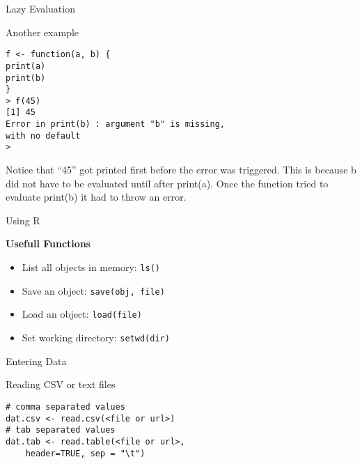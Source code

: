 \begin{frame}[fragile]{Lazy Evaluation}

Another example

\begin{verbatim}
f <- function(a, b) {
print(a)
print(b)
}
> f(45)
[1] 45
Error in print(b) : argument "b" is missing, 
with no default
>
\end{verbatim}

Notice that ``45'' got printed first before the error was triggered.
This is because b did not have to be evaluated until after print(a).
Once the function tried to evaluate print(b) it had to throw an error.

\end{frame}

\begin{frame}[fragile]{Using R}

\begin{block}{\textbf{Usefull Functions}}

\begin{itemize}
\item
  List all objects in memory: \texttt{ls()}
\item
  Save an object: \texttt{save(obj,\ file)}
\item
  Load an object: \texttt{load(file)}
\item
  Set working directory: \texttt{setwd(dir)}
\end{itemize}

\end{block}

\end{frame}

\begin{frame}[fragile]{Entering Data}

\begin{block}{Reading CSV or text files}

\begin{verbatim}
# comma separated values
dat.csv <- read.csv(<file or url>)
# tab separated values
dat.tab <- read.table(<file or url>, 
    header=TRUE, sep = "\t")
\end{verbatim}

\end{block}

\end{frame}

